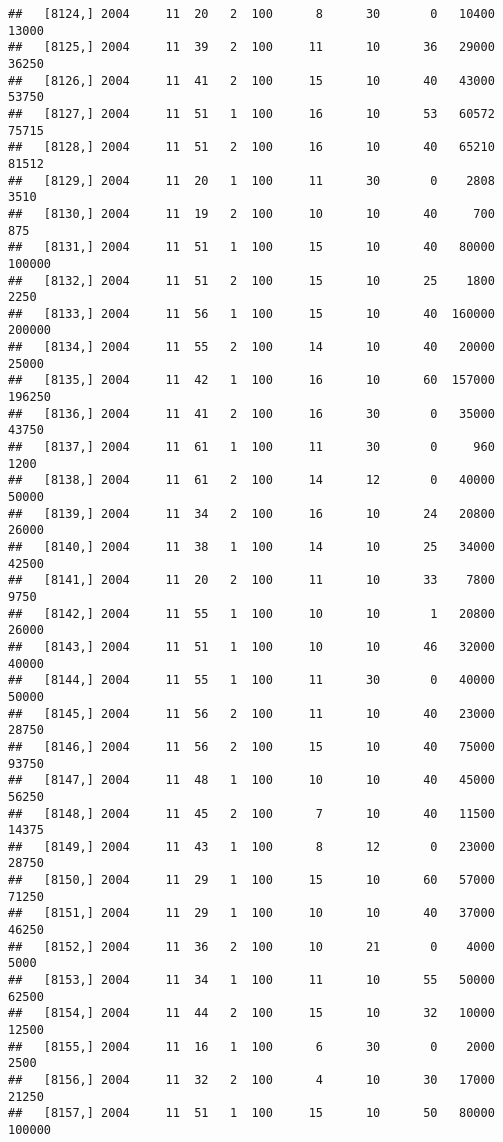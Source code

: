 \documentclass{article}\usepackage[]{graphicx}\usepackage[]{color}
\makeatletter
\newenvironment{kframe}{%
 \def\at@end@of@kframe{}%
 \ifinner\ifhmode%
  \def\at@end@of@kframe{\end{minipage}}%
  \begin{minipage}{\columnwidth}%
 \fi\fi%
 \def\FrameCommand##1{\hskip\@totalleftmargin \hskip-\fboxsep
 \colorbox{shadecolor}{##1}\hskip-\fboxsep
     \hskip-\linewidth \hskip-\@totalleftmargin \hskip\columnwidth}%
 \MakeFramed {\advance\hsize-\width
   \@totalleftmargin\z@ \linewidth\hsize
   \@setminipage}}%
 {\par\unskip\endMakeFramed%
 \at@end@of@kframe}
\newenvironment{knitrout}{}{} %
\makeatother
\begin{document}
\begin{knitrout}
\begin{kframe}
\begin{verbatim}
##   [8124,] 2004     11  20   2  100      8      30       0   10400   13000
##   [8125,] 2004     11  39   2  100     11      10      36   29000   36250
##   [8126,] 2004     11  41   2  100     15      10      40   43000   53750
##   [8127,] 2004     11  51   1  100     16      10      53   60572   75715
##   [8128,] 2004     11  51   2  100     16      10      40   65210   81512
##   [8129,] 2004     11  20   1  100     11      30       0    2808    3510
##   [8130,] 2004     11  19   2  100     10      10      40     700     875
##   [8131,] 2004     11  51   1  100     15      10      40   80000  100000
##   [8132,] 2004     11  51   2  100     15      10      25    1800    2250
##   [8133,] 2004     11  56   1  100     15      10      40  160000  200000
##   [8134,] 2004     11  55   2  100     14      10      40   20000   25000
##   [8135,] 2004     11  42   1  100     16      10      60  157000  196250
##   [8136,] 2004     11  41   2  100     16      30       0   35000   43750
##   [8137,] 2004     11  61   1  100     11      30       0     960    1200
##   [8138,] 2004     11  61   2  100     14      12       0   40000   50000
##   [8139,] 2004     11  34   2  100     16      10      24   20800   26000
##   [8140,] 2004     11  38   1  100     14      10      25   34000   42500
##   [8141,] 2004     11  20   2  100     11      10      33    7800    9750
##   [8142,] 2004     11  55   1  100     10      10       1   20800   26000
##   [8143,] 2004     11  51   1  100     10      10      46   32000   40000
##   [8144,] 2004     11  55   1  100     11      30       0   40000   50000
##   [8145,] 2004     11  56   2  100     11      10      40   23000   28750
##   [8146,] 2004     11  56   2  100     15      10      40   75000   93750
##   [8147,] 2004     11  48   1  100     10      10      40   45000   56250
##   [8148,] 2004     11  45   2  100      7      10      40   11500   14375
##   [8149,] 2004     11  43   1  100      8      12       0   23000   28750
##   [8150,] 2004     11  29   1  100     15      10      60   57000   71250
##   [8151,] 2004     11  29   1  100     10      10      40   37000   46250
##   [8152,] 2004     11  36   2  100     10      21       0    4000    5000
##   [8153,] 2004     11  34   1  100     11      10      55   50000   62500
##   [8154,] 2004     11  44   2  100     15      10      32   10000   12500
##   [8155,] 2004     11  16   1  100      6      30       0    2000    2500
##   [8156,] 2004     11  32   2  100      4      10      30   17000   21250
##   [8157,] 2004     11  51   1  100     15      10      50   80000  100000

\end{verbatim}
\end{kframe}
\end{knitrout}
\end{document}
